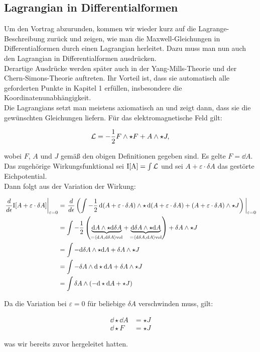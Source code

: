\subsection{Lagrangian in Differentialformen}

Um den Vortrag abzurunden, kommen wir wieder kurz auf die Lagrange-Beschreibung zurück und zeigen, wie man die Maxwell-Gleichungen in Differentialformen durch einen Lagrangian herleitet. Dazu muss man nun auch den Lagrangian in Differentialformen ausdrücken. \\

Derartige Ausdrücke werden später auch in der Yang-Mills-Theorie und der Chern-Simons-Theorie auftreten. Ihr Vorteil ist, dass sie automatisch alle geforderten Punkte in Kapitel 1 erfüllen, insbesondere die Koordinatenunabhängigkeit. \\

Die Lagrangians setzt man meistens axiomatisch an und zeigt dann, dass sie die gewünschten Gleichungen liefern. Für das elektromagnetische Feld gilt:

\begin{align}
\mathcal{L} = - \frac{1}{2} F \wedge \star F + A \wedge \star J,
\end{align}

wobei $F$, $A$ und $J$ gemäß den obigen Definitionen gegeben sind. Es gelte $F = \dd A$. \\

Das zugehörige Wirkungsfunktional sei $\text{I[A]}=\int \mathcal{L}$ und sei $A + \varepsilon \cdot \delta A$ das gestörte Eichpotential. \\
Dann folgt aus der Variation der Wirkung: 

\begin{align*}
\eval{\frac{d}{d \epsilon} \text{I}[A + \varepsilon \cdot \delta A]}_{\varepsilon=0} &= \eval{\frac{d}{d \epsilon} \left( \int - \frac{1}{2} \dd(A + \varepsilon \cdot \delta A) \w \star \dd(A + \varepsilon \cdot \delta A) + (A + \varepsilon \cdot \delta A) \w \star J \right)}_{\varepsilon=0} \\
&= \int - \frac{1}{2} \left(\underbrace{\dd A  \w \star \dd \delta A}_{=  \left< \dd A, \dd \delta A \right>\text{vol}}  + \underbrace{\dd \delta A \w \star \dd A}_{=  \left< \dd \delta A, \dd A \right>\text{vol}} \right) + \delta A \w \star J \\
&= \int - \dd \delta A \w \star \dd A + \delta A \w \star J  \\
&= \int - \delta A \w \dd \star \dd A + \delta A \w \star J \\
&= \int \delta A \w \left( - \dd \star \dd A + \star J \right)
\end{align*}

Da die Variation bei $\varepsilon = 0$ für beliebige $\delta A$ verschwinden muss, gilt: 

\begin{align}
\dd \star \dd A &= \star J \\
\dd \star F &= \star J
\end{align}

was wir bereits zuvor hergeleitet hatten.
